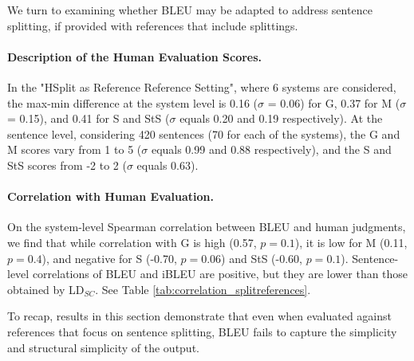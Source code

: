 \documentclass[11pt,a4paper]{article}
\begin{document}
We turn to examining whether BLEU may be adapted to address sentence splitting, if provided with references that include splittings.

\paragraph{Description of the Human Evaluation Scores.}

In the "HSplit as Reference Reference Setting", where 6 systems are considered, the max-min difference at the system level is 0.16 ($\sigma$ = 0.06) for G, 0.37 for M ($\sigma$ = 0.15), and 0.41 for S and StS ($\sigma$ equals 0.20 and 0.19 respectively). At the sentence level, considering 420 sentences (70 for each of the systems), the G and M scores vary from 1 to 5 ($\sigma$ equals 0.99 and 0.88 respectively), and the S and StS scores from -2 to 2 ($\sigma$ equals 0.63).

\paragraph{Correlation with Human Evaluation.}

On the system-level Spearman correlation between BLEU and human judgments, we
find that while correlation with G is high (0.57, $p=0.1$), %
 it is low for M (0.11, $p= 0.4$),
and negative for S (-0.70, $p= 0.06$) and StS (-0.60, $p = 0.1$). Sentence-level correlations of BLEU and iBLEU are positive,
but they are lower than those obtained by LD$_{SC}$. See Table \ref{tab:correlation_splitreferences}. 

To recap, results in this section demonstrate that even when evaluated against references that
focus on sentence splitting, BLEU fails to capture the simplicity and structural simplicity of the output.

\end{document}
